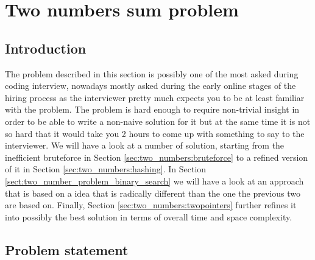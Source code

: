 %


\chapter{Two numbers sum problem}
\label{ch:two_numbers_sum}
\section*{Introduction}
The problem described in this section is possibly one of the most asked during coding interview, nowadays mostly 
asked during the early online stages of the hiring process as the interviewer pretty much expects you to be at least familiar with the problem.
The problem is hard enough to require non-trivial insight in order to be able to write a non-naive solution for it but at the same time it is not so hard that it would take you 2 hours to come up with something to say to the interviewer.
We will have a look at a number of solution, starting from the inefficient bruteforce in Section \ref{sec:two_numbers:bruteforce} to a refined version of it in Section \ref{sec:two_numbers:hashing}.
In Section \ref{sect:two_number_problem_binary_search} we will have a look at an approach that is based on a idea that is radically different than the one the previous two are based on.
Finally, Section \ref{sec:two_numbers:twopointers} further refines it into  possibly the best solution in terms of overall time and space complexity.

\section{Problem statement}

